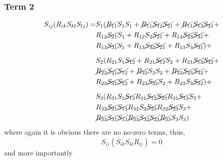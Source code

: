 \subsubsection{Term 2}
\begin{equation}
    \begin{split}
        S_{ij}(R_{ik}S_{kl}S_{lj}) = & 
            S_{1}(
            \cancel{R_{11}}S_{1}S_{1} + \cancel{R_{11}}\cancel{S_{12}}\cancel{S_{21}} + \cancel{R_{11}}\cancel{S_{13}}\cancel{S_{31}}    +   \\
        &   R_{12}\cancel{S_{21}}S_{1} + R_{12}S_{2}\cancel{S_{21}} + R_{12}\cancel{S_{23}}\cancel{S_{31}}    +   \\
        &   R_{13}\cancel{S_{31}}S_{1} + R_{13}\cancel{S_{32}}\cancel{S_{21}} + R_{13}S_{3}\cancel{S_{31}}
            ) + \\[6pt]
        &   S_{2}(
            R_{21}S_{1}\cancel{S_{12}} + R_{21}\cancel{S_{12}}S_{2} + R_{21}\cancel{S_{13}}\cancel{S_{32}}    +   \\
        &   \cancel{R_{22}}\cancel{S_{21}}\cancel{S_{12}} + \cancel{R_{22}}S_{2}S_{2} + \cancel{R_{22}}\cancel{S_{23}}\cancel{S_{32}}    +   \\
        &   R_{23}\cancel{S_{31}}\cancel{S_{12}} + R_{23}\cancel{S_{32}}S_{2} + R_{23}S_{3}\cancel{S_{32}}
            ) + \\[6pt]
        &   S_{3}(
            R_{31}S_{1}\cancel{S_{13}} R_{31}\cancel{S_{12}}\cancel{S_{23}} R_{31}\cancel{S_{13}}S_{3}        +   \\
        &   R_{32}\cancel{S_{21}}\cancel{S_{13}} R_{32}S_{2}\cancel{S_{23}} R_{32}\cancel{S_{23}}S_{3}        +   \\
        &   \cancel{R_{33}}\cancel{S_{31}}\cancel{S_{13}} \cancel{R_{33}}\cancel{S_{32}}\cancel{S_{23}} \cancel{R_{33}}S_{3}S_{3})
    \end{split}
\end{equation}
where again it is obvious there are no no-zero terms, thus,
\begin{equation}
        S_{ij}(S_{ik}S_{kl}R_{lj}) = 0
\end{equation}
and more importantly
